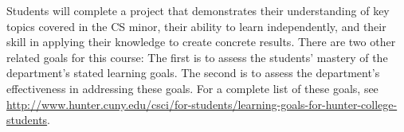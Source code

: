 
Students will complete a project that demonstrates their understanding of key topics covered in the CS minor, their ability to learn independently, and their skill in applying their knowledge to create concrete results. There are two other related goals for this course: The first is to assess the students’ mastery of the department’s stated learning goals. The second is to assess the department’s effectiveness in addressing these goals. For a complete list of these goals, see \href{http://www.hunter.cuny.edu/csci/for-students/learning-goals-for-hunter-college-students}{http://www.hunter.cuny.edu/csci/for-students/learning-goals-for-hunter-college-students}.


